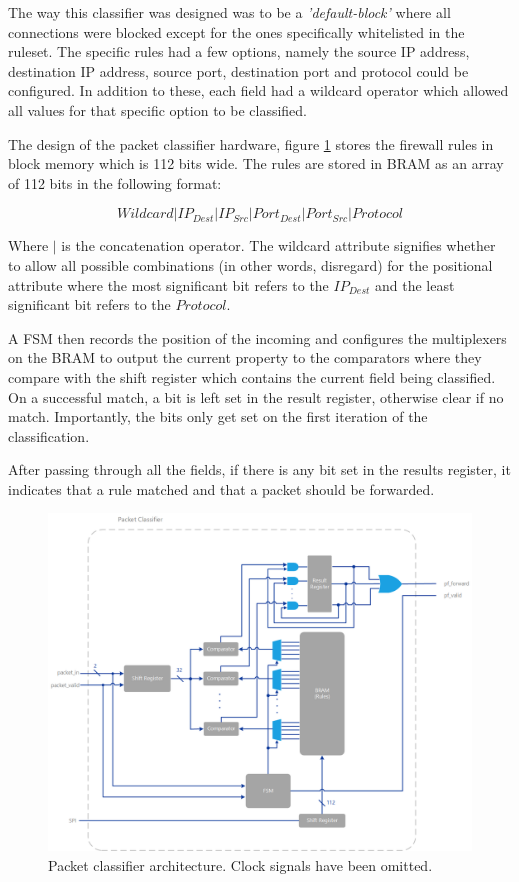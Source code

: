 The way this classifier was designed was to be a \textit{'default-block'} where all connections were blocked except for the ones specifically whitelisted in the ruleset. The specific rules had a few options, namely the source IP address, destination IP address, source port, destination port and protocol could be configured. In addition to these, each field had a wildcard operator which allowed all values for that specific option to be classified. 


The design of the packet classifier hardware, figure \ref{fig:packet_classifier_architecture} stores the firewall rules in block memory which is 112 bits wide. The rules are stored in BRAM as an array of 112 bits in the following format:

\[
Wildcard | IP_{Dest} |  IP_{Src}  | Port_{Dest} |  Port_{Src} | Protocol
\]

Where $|$ is the concatenation operator. The wildcard attribute signifies whether to allow all possible combinations (in other words, disregard) for the positional attribute where the most significant bit refers to the $IP_{Dest}$ and the least significant bit refers to the $Protocol$.

A FSM then records the position of the incoming and configures the multiplexers on the BRAM to output the current property to the comparators where they compare with the shift register which contains the current field being classified. On a successful match, a bit is left set in the result register, otherwise clear if no match. Importantly, the bits only get set on the first iteration of the classification. 

After passing through all the fields, if there is any bit set in the results register, it indicates that a rule matched and that a packet should be forwarded. 


\begin{figure}[h!]
    \centering
    \includegraphics[width=1\textwidth]{Images/PacketFilterArchitecture.png}
    \caption[Packet classifier architecture]{Packet classifier architecture. Clock signals have been omitted.}
    \label{fig:packet_classifier_architecture}
\end{figure}

